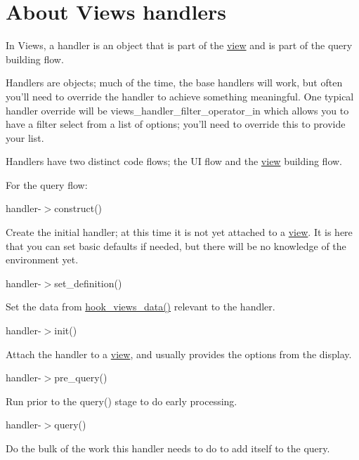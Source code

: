 \hypertarget{group__views__handlers}{
\section{About Views handlers}
\label{group__views__handlers}
}
In Views, a handler is an object that is part of the \hyperlink{classview}{view} and is part of the query building flow.

Handlers are objects; much of the time, the base handlers will work, but often you'll need to override the handler to achieve something meaningful. One typical handler override will be views\_\-handler\_\-filter\_\-operator\_\-in which allows you to have a filter select from a list of options; you'll need to override this to provide your list.

Handlers have two distinct code flows; the UI flow and the \hyperlink{classview}{view} building flow.

For the query flow:
\begin{DoxyItemize}
\item handler-\/$>$construct()
\begin{DoxyItemize}
\item Create the initial handler; at this time it is not yet attached to a \hyperlink{classview}{view}. It is here that you can set basic defaults if needed, but there will be no knowledge of the environment yet.
\end{DoxyItemize}
\item handler-\/$>$set\_\-definition()
\begin{DoxyItemize}
\item Set the data from \hyperlink{group__views__hooks_ga227057901681e4a33e33c199c7a8c989}{hook\_\-views\_\-data()} relevant to the handler.
\end{DoxyItemize}
\item handler-\/$>$init()
\begin{DoxyItemize}
\item Attach the handler to a \hyperlink{classview}{view}, and usually provides the options from the display.
\end{DoxyItemize}
\item handler-\/$>$pre\_\-query()
\begin{DoxyItemize}
\item Run prior to the query() stage to do early processing.
\end{DoxyItemize}
\item handler-\/$>$query()
\begin{DoxyItemize}
\item Do the bulk of the work this handler needs to do to add itself to the query.
\end{DoxyItemize}
\end{DoxyItemize}


